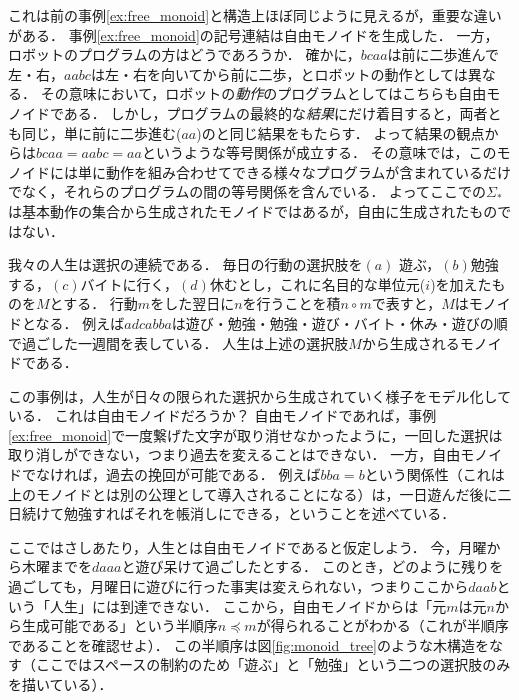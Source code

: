 \documentclass[11pt,a4paper, dvipdfmx]{jsarticle}
\begin{document}
これは前の事例\ref{ex:free_monoid}と構造上ほぼ同じように見えるが，重要な違いがある．
事例\ref{ex:free_monoid}の記号連結は自由モノイドを生成した．
一方，ロボットのプログラムの方はどうであろうか．
確かに，$bcaa$は前に二歩進んで左・右，$aabc$は左・右を向いてから前に二歩，とロボットの動作としては異なる．
その意味において，ロボットの\emph{動作}のプログラムとしてはこちらも自由モノイドである．
しかし，プログラムの最終的な\emph{結果}にだけ着目すると，両者とも同じ，単に前に二歩進む($aa$)のと同じ結果をもたらす．
よって結果の観点からは$bcaa = aabc = aa$というような等号関係が成立する．
その意味では，このモノイドには単に動作を組み合わせてできる様々なプログラムが含まれているだけでなく，それらのプログラムの間の等号関係を含んでいる．
よってここでの$\Sigma_*$は基本動作の集合から生成されたモノイドではあるが，自由に生成されたものではない．



\begin{example}[人生]
    我々の人生は選択の連続である．
    毎日の行動の選択肢を$(a)$ 遊ぶ，$(b)$勉強する，$(c)$バイトに行く，$(d)$休むとし，これに名目的な単位元($i$)を加えたものを$M$とする．
    行動$m$をした翌日に$n$を行うことを積$n \circ m$で表すと，$M$はモノイドとなる．
    例えば$adcabba$は遊び・勉強・勉強・遊び・バイト・休み・遊びの順で過ごした一週間を表している．
    人生は上述の選択肢$M$から生成されるモノイドである．
\end{example}

この事例は，人生が日々の限られた選択から生成されていく様子をモデル化している．
これは自由モノイドだろうか？
自由モノイドであれば，事例\ref{ex:free_monoid}で一度繋げた文字が取り消せなかったように，一回した選択は取り消しができない，つまり過去を変えることはできない．
一方，自由モノイドでなければ，過去の挽回が可能である．
例えば$bba = b$という関係性（これは上のモノイドとは別の公理として導入されることになる）は，一日遊んだ後に二日続けて勉強すればそれを帳消しにできる，ということを述べている．

ここではさしあたり，人生とは自由モノイドであると仮定しよう．
今，月曜から木曜までを$daaa$と遊び呆けて過ごしたとする．
このとき，どのように残りを過ごしても，月曜日に遊びに行った事実は変えられない，つまりここから$daab$という「人生」には到達できない．
ここから，自由モノイドからは「元$m$は元$n$から生成可能である」という半順序$n \preceq m$が得られることがわかる（これが半順序であることを確認せよ）．
この半順序は図\ref{fig:monoid_tree}のような木構造をなす（ここではスペースの制約のため「遊ぶ」と「勉強」という二つの選択肢のみを描いている）．
\end{document}
